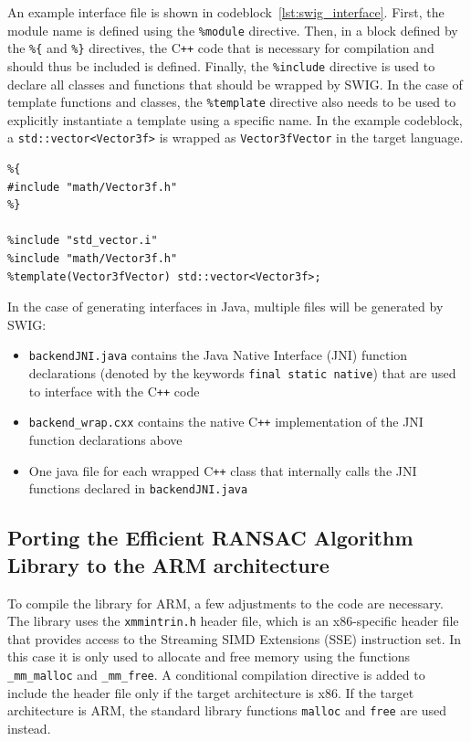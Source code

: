 An example interface file is shown in codeblock~\ref{lst:swig_interface}.
First, the module name is defined using the \texttt{\%module} directive.
Then, in a block defined by the \texttt{\%\{} and \texttt{\%\}} directives,
the C\texttt{++} code that is necessary for compilation and should thus be included is defined.
Finally, the \texttt{\%include} directive is used to declare all classes and functions that should be wrapped by SWIG\@.
In the case of template functions and classes, the \texttt{\%template} directive also needs to be used
to explicitly instantiate a template using a specific name.
In the example codeblock, a \texttt{std::vector<Vector3f>} is wrapped as \texttt{Vector3fVector} in the target language.

\begin{lstlisting}[caption=Example SWIG interface file, label=lst:swig_interface]
%module backend
%{
#include "math/Vector3f.h"
%}

%include "std_vector.i"
%include "math/Vector3f.h"
%template(Vector3fVector) std::vector<Vector3f>;
\end{lstlisting}

In the case of generating interfaces in Java, multiple files will be generated by SWIG\@:
\begin{itemize}
    \item \texttt{backendJNI.java} contains the Java Native Interface (JNI) function declarations (denoted by the keywords \texttt{final static native}) that are used to interface with the C\texttt{++} code
    \item \texttt{backend\_wrap.cxx} contains the native C\texttt{++} implementation of the JNI function declarations above
    \item One java file for each wrapped C\texttt{++} class that internally calls the JNI functions declared in \texttt{backendJNI.java}
\end{itemize}




\subsection{Porting the Efficient RANSAC Algorithm Library to the ARM architecture}
%
To compile the library for ARM, a few adjustments to the code are necessary.
The library uses the \texttt{xmmintrin.h} header file, which is an x86-specific header file
that provides access to the Streaming SIMD Extensions (SSE) instruction set. %
In this case it is only used to allocate and free memory using the functions \texttt{\_mm\_malloc} and \texttt{\_mm\_free}.
A conditional compilation directive is added to include the header file only if the target architecture is x86.
If the target architecture is ARM, the standard library functions \texttt{malloc} and \texttt{free} are used instead.

